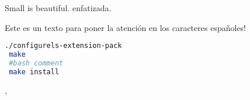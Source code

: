 \documentclass{article}
\begin{document}
Small is beautiful.\newline
\SWNT\newline
{} enfatizada.

Este es un texto para poner la atención en los caracteres españoles!

\begin{lstlisting}[backgroundcolor = \color{mfc_gray1},
                   language = bash]
 ./configurels-extension-pack
 make 
 #bash comment
 make install
\end{lstlisting}

\begin{comment} 
Este es un comentario
multiline
gracias al verbatim package
\end{comment}

, 
\end{document}

